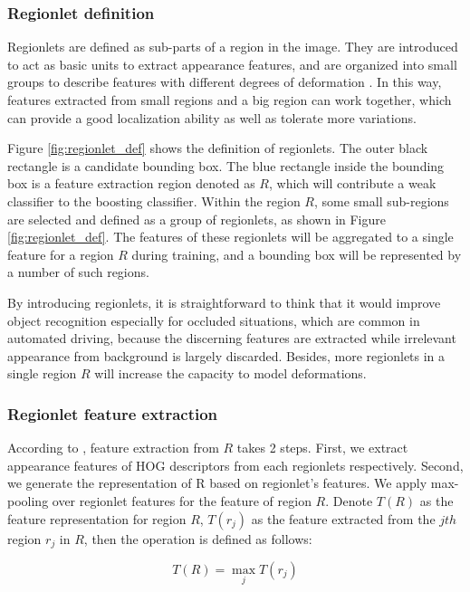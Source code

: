 \documentclass{article} %
\begin{document}
\subsubsection{Regionlet definition}

Regionlets are defined as sub-parts of a region in the image. They are introduced to act as basic units to extract appearance features, and are organized into small groups to describe features with different degrees of deformation \cite{Wang2013}. In this way, features extracted from small regions and a big region can work together, which can provide a good localization ability as well as tolerate more variations.

Figure \ref{fig:regionlet_def} shows the definition of regionlets. The outer black rectangle is a candidate bounding box. The blue rectangle inside the bounding box is a feature extraction region denoted as $R$, which will contribute a weak classifier to the boosting classifier. Within the region $R$, some small sub-regions are selected and defined as a group of regionlets, as shown in Figure \ref{fig:regionlet_def}. The features of these regionlets will be aggregated to a single feature for a region $R$ during training, and a bounding box will be represented by a number of such regions.

By introducing regionlets, it is straightforward to think that it would improve object recognition especially for occluded situations, which are common in automated driving, because the discerning features are extracted while irrelevant appearance from background is largely discarded. Besides, more regionlets in a single region $R$ will increase the capacity to model deformations.


\subsubsection{Regionlet feature extraction}

According to \cite{Wang2013}, feature extraction from $R$ takes 2 steps. First, we extract appearance features of HOG descriptors \cite{dalal2005histograms} from each regionlets respectively. Second, we generate the representation of R based on regionlet’s features. We apply max-pooling over regionlet features for the feature of region $R$. Denote $T(R)$ as the feature representation for region $R$, $T(r_j)$ as the feature extracted from the $jth$ region $r_j$ in $R$, then the operation is defined as follows:

\begin{equation}
T(R) = \max \limits_j T(r_j)
\end{equation}
\end{document}
